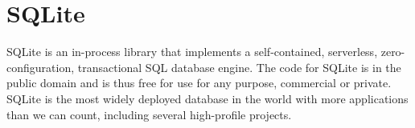 \section{SQLite}
SQLite is an in-process library that implements a self-contained, serverless,
zero-configuration, transactional SQL database engine. The code for SQLite is
in the public domain and is thus free for use for any purpose, commercial or
private. SQLite is the most widely deployed database in the world with more
applications than we can count, including several high-profile projects.\cite{www-sqlite}
